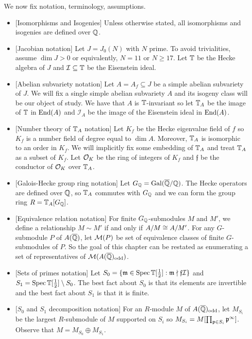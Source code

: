 \documentclass{article}
\renewcommand{\f}{\mathfrak{f}}
\newcommand{\I}{\mathcal{I}}
\newcommand{\odd}{\mathrm{odd}}
\begin{document}
We now fix notation, terminology, assumptions.
\begin{itemize}
    \item{} [Isomorphisms and Isogenies]
        Unless otherwise stated, all isomorphisms and isogenies are defined
        over $\mathbb{Q}$.
    \item{} [Jacobian notation]
        Let $J = J_0(N)$ with $N$ prime. To avoid trivialities, assume $\dim
        J>0$ or equivalently, $N=11$ or $N\geq 17$. Let $\mathbb{T}$ be the Hecke
        algebra of $J$ and $\I\subseteq \TT$ be the Eisenstein ideal.
    \item{} [Abelian subvariety notation]
        Let $A=A_f\subseteq J$ be a simple abelian subvariety of $J$. We will
        fix a single simple abelian subvariety $A$ and its isogeny class will
        be our object of study. We have that $A$ is $\mathbb{T}$-invariant so let
        $\mathbb{T}_A$ be the image of $\mathbb{T}$ in $\operatorname{End}(A)$ and $\I_A$ be the image of
        the Eisenstein ideal in $\operatorname{End}(A)$. 
    \item{} [Number theory of $\mathbb{T}_A$ notation] 
        Let $K_f$ be the Hecke eigenvalue field of $f$ so $K_f$ is a number
        field of degree equal to $\dim A$. Moreover, $\mathbb{T}_A$ is isomorphic to
        an order in $K_f$. We will implicitly fix some embedding of $\mathbb{T}_A$ and
        treat $\mathbb{T}_A$ as a subset of $K_f$. Let $\mathcal{O}_K$ be the ring of integers
        of $K_f$ and $\f$ be the conductor of $\mathcal{O}_K$ over $\mathbb{T}_A$.
    \item{} [Galois-Hecke group ring notation]
        Let $G_{\mathbb{Q}}=\operatorname{Gal}(\overline{\mathbb{Q}}/\mathbb{Q})$. The Hecke operators are defined over
        $\mathbb{Q}$, so $\mathbb{T}_A$ commutes with $G_{\mathbb{Q}}$ and we can form the group ring
        $R=\mathbb{T}_A[G_{\mathbb{Q}}]$.
    \item{} [Equivalence relation notation]
        For finite $G_{\mathbb{Q}}$-submodules $M$ and $M'$, we define a relationship
        $M\sim M'$ if and only if $A/M \cong A/M'$. For any $G$-submodule $P$
        of $A(\overline{\mathbb{Q}})$, let $\mathcal{M}(P)$ be set of equivalence classes of finite
        $G$-submodules of $P$. So the goal of this chapter can be restated as
        enumerating a set of representatives of $\M(A(\QQbar)_\odd)$.
    \item{} [Sets of primes notation]
        Let $S_0=\{\mathfrak{m}\in \operatorname{Spec}\mathbb{T}[\frac 12]: \mathfrak{m} \nmid
        \mathfrak{f}\mathcal{I}\}$ and $S_1 = \operatorname{Spec}\mathbb{T}[\frac 12]\setminus S_0$.
        The best fact about $S_0$ is that its elements are invertible and the
        best fact about $S_1$ is that it is finite.
    \item{} [$S_0$ and $S_1$ decomposition notation]
        For an $R$-module $M$ of $A(\QQbar)_\odd$, let $M_{S_i}$ be the largest
        $R$-submodule of $M$ supported on $S_i$ so $M_{S_i}=M[\prod_{\mathfrak{p}\in S_i}
        \mathfrak{p}^\infty]$. Observe that $M = M_{S_0}\oplus M_{S_1}$.
\end{itemize}
\end{document}
